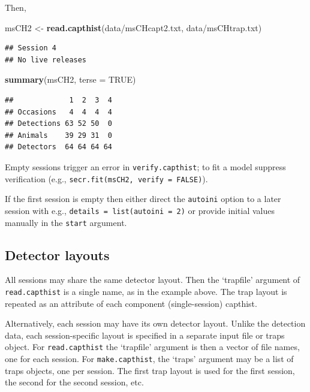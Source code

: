 \documentclass[
]{book}
\newenvironment{Shaded}{\begin{snugshade}}{\end{snugshade}}
\newcommand{\AttributeTok}[1]{\textcolor[rgb]{0.13,0.29,0.53}{#1}}
\newcommand{\ConstantTok}[1]{\textcolor[rgb]{0.56,0.35,0.01}{#1}}
\newcommand{\FunctionTok}[1]{\textcolor[rgb]{0.13,0.29,0.53}{\textbf{#1}}}
\newcommand{\NormalTok}[1]{#1}
\newcommand{\OtherTok}[1]{\textcolor[rgb]{0.56,0.35,0.01}{#1}}
\newcommand{\StringTok}[1]{\textcolor[rgb]{0.31,0.60,0.02}{#1}}
\begin{document}
Then,

\begin{Shaded}
\begin{Highlighting}[]
\NormalTok{msCH2 }\OtherTok{\textless{}{-}} \FunctionTok{read.capthist}\NormalTok{(}\StringTok{\textquotesingle{}data/msCHcapt2.txt\textquotesingle{}}\NormalTok{, }\StringTok{\textquotesingle{}data/msCHtrap.txt\textquotesingle{}}\NormalTok{)}
\end{Highlighting}
\end{Shaded}

\begin{verbatim}
## Session 4 
## No live releases
\end{verbatim}

\begin{Shaded}
\begin{Highlighting}[]
\FunctionTok{summary}\NormalTok{(msCH2, }\AttributeTok{terse =} \ConstantTok{TRUE}\NormalTok{)}
\end{Highlighting}
\end{Shaded}

\begin{verbatim}
##             1  2  3  4
## Occasions   4  4  4  4
## Detections 63 52 50  0
## Animals    39 29 31  0
## Detectors  64 64 64 64
\end{verbatim}

Empty sessions trigger an error in \texttt{verify.capthist}; to fit a model suppress verification (e.g., \texttt{secr.fit(msCH2,\ verify\ =\ FALSE)}).

If the first session is empty then either direct the \texttt{autoini} option to a later session with e.g., \texttt{details\ =\ list(autoini\ =\ 2)} or provide initial values manually in the \texttt{start} argument.

\subsection{Detector layouts}\label{detector-layouts}

All sessions may share the same detector layout. Then the `trapfile' argument of \texttt{read.capthist} is a single name, as in the example above. The trap layout is repeated as an attribute of each component (single-session) capthist.

Alternatively, each session may have its own detector layout. Unlike the detection data, each session-specific layout is specified in a separate input file or traps object. For \texttt{read.capthist} the `trapfile' argument is then a vector of file names, one for each session. For \texttt{make.capthist}, the `traps' argument may be a list of traps objects, one per session. The first trap layout is used for the first session, the second for the second session, etc.
\end{document}
